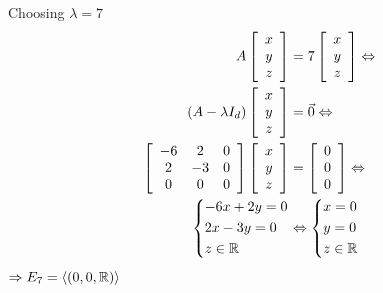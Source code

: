 {    Choosing $\lambda = 7$\\
    \begin{align*}
        A\left[\begin{array}{c}
            x\\
            y\\
            z
        \end{array}\right] & = 7\left[\begin{array}{c}
            x\\
            y\\
            z
        \end{array}\right]\Leftrightarrow\\
        (A-\lambda I_d)\left[\begin{array}{c}
            x\\
            y\\
            z
        \end{array}\right] & = \vec{0} \Leftrightarrow\\
        \left[\begin{array}{ccc}
            -6 & 2 & 0\\
            2 & -3 & 0\\
            0 & 0 & 0
        \end{array}\right]\left[\begin{array}{c}
            x\\
            y\\
            z
        \end{array}\right] & = \left[\begin{array}{c}
            0\\
            0\\
            0
        \end{array}\right] \Leftrightarrow\\
        \begin{cases*}
            -6x+2y = 0\\
            2x - 3y = 0\\
            z \in \bbR
        \end{cases*} & \Leftrightarrow \begin{cases*}
            x = 0\\
            y = 0\\
            z \in \bbR
        \end{cases*}
    \end{align*}
    $\Rightarrow E_7 = \langle(0,0,\mathbb{R})\rangle$
}
